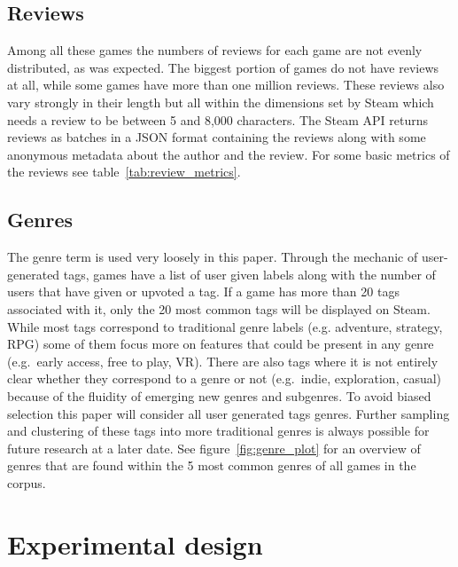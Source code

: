 \documentclass[11pt, a4paper]{article}
\begin{document}



\subsection{Reviews}\label{subsec:reviews}
Among all these games the numbers of reviews for each game are not evenly distributed, as was expected.
The biggest portion of games do not have reviews at all, while some games have more than one million reviews.
These reviews also vary strongly in their length but all within the dimensions set by Steam which needs a review to
be between 5 and 8,000 characters.
The Steam API returns reviews as batches in a JSON format containing the reviews along with some anonymous metadata
about the author and the review.
For some basic metrics of the reviews see table~\ref{tab:review_metrics}.




\subsection{Genres}\label{subsec:genres}
The genre term is used very loosely in this paper.
Through the mechanic of user-generated tags, games have a list of user given labels along with the number of users
that have given or upvoted a tag.
If a game has more than 20 tags associated with it, only the 20 most common tags will be displayed on Steam.
While most tags correspond to traditional genre labels (e.g. adventure, strategy, RPG) some of them focus more on
features that could be present in any genre (e.g.\ early access, free to play, VR). There are also tags where it is
not entirely clear whether they correspond to a genre or not (e.g.\ indie, exploration, casual) because of the fluidity
of emerging new genres and subgenres.
To avoid biased selection this paper will consider all user generated tags genres.
Further sampling and clustering of these tags into more traditional genres is always possible for future research at a
later date.
See figure~\ref{fig:genre_plot} for an overview of genres that are found within the 5 most common genres of all games
in the corpus.



\section{Experimental design}\label{sec:experimental-design}
\end{document}
